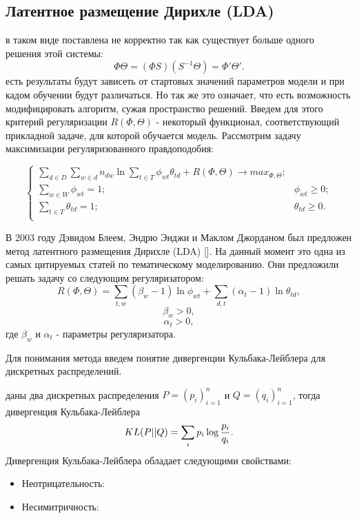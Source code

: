 \subsection{Латентное размещение Дирихле (LDA)}

 в таком виде поставлена не корректно так как существует больше одного решения этой системы:
$$
\Phi\Theta = (\Phi S)(S^{-1}\Theta)=\Phi'\Theta'.
$$
 есть результаты будут зависеть от стартовых значений параметров модели и при кадом обучении будут различаться. Но так же это означает, что есть возможность модифицировать алгоритм, сужая пространство решений. Введем для этого критерий регуляризации $R(\Phi,\Theta)$ - некоторый функционал, соответствующий прикладной задаче, для которой обучается модель. Рассмотрим задачу максимизации регуляризованного правдоподобия:

$$ 
\begin{cases}
    \sum_{d \in D} \sum_{w \in d} n_{dw} \ln{\sum_{t \in T} \phi_{wt} \theta_{td} } + R(\Phi,\Theta) \rightarrow max_{\Phi,\Theta};\\
    \sum_{w \in W}\phi_{wt} = 1; &\phi_{wt} \ge 0;\\
    \sum_{t \in T}\theta_{td} = 1; &\theta_{td} \ge 0.\\
\end{cases}
$$

В 2003 году Дэвидом Блеем, Эндрю Энджи и Маклом Джорданом был предложен метод латентного размещения Дирихле (LDA) [\todo{}]. На данный момент это одна из самых цитируемых статей по тематическому моделированию. Они предложили решать задачу со следующим регуляризатором:
$$
R(\Phi,\Theta) = \sum_{t,w}{(\beta_w-1)\ln{\phi_{wt}}} + \sum_{d,t}{(\alpha_t-1)\ln{\theta_{td}}},
$$
$$
\beta_w > 0, 
$$
$$
\alpha_t > 0,
$$
где $\beta_w$ и $\alpha_t$ - параметры регуляризатора.

Для понимания метода введем понятие дивергенции Кульбака-Лейблера для дискретных распределений.

 даны два дискретных распределения $P=(p_i)_{i=1}^n$ и $Q=(q_i)_{i=1}^n$, тогда дивергенция Кульбака-Лейблера
$$
KL(P||Q)=\sum_i{p_i \log{{p_i}\over{q_i}}}.
$$
Дивергенция Кульбака-Лейблера обладает следующими свойствами:

\begin{itemize}
    \item Неотрицательность:
    \item Несимитричность:
\end{itemize}

